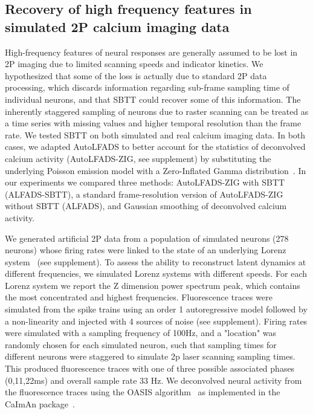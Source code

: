 \documentclass{article}
\begin{document}
\subsection{Recovery of high frequency features in simulated 2P calcium imaging data}

High-frequency features of neural responses are generally assumed to be lost in 2P imaging due to limited scanning speeds and indicator kinetics. We hypothesized that some of the loss is actually due to standard 2P data processing, which discards information regarding sub-frame sampling time of individual neurons, and that SBTT could recover some of this information. The inherently staggered sampling of neurons due to raster scanning can be treated as a time series with missing values and higher temporal resolution than the frame rate. We tested SBTT on both simulated and real calcium imaging data. In both cases, we adapted AutoLFADS to better account for the statistics of deconvolved calcium activity (AutoLFADS-ZIG, see supplement) by substituting the underlying Poisson emission model with a Zero-Inflated Gamma distribution~\cite{wei2020zero}. In our experiments we compared three methods: AutoLFADS-ZIG with SBTT (ALFADS-SBTT), a standard frame-resolution version of AutoLFADS-ZIG without SBTT (ALFADS), and Gaussian smoothing of deconvolved calcium activity. 


We generated artificial 2P data from a population of simulated neurons (278 neurons) whose firing rates were linked to the state of an underlying Lorenz system~\cite{zhao2017variational,sussillo2016lfads} (see supplement). To assess the ability to reconstruct latent dynamics at different frequencies, we simulated Lorenz systems with different speeds. For each Lorenz system we report the Z dimension power spectrum peak, which contains the most concentrated and highest frequencies. Fluorescence traces were simulated from the spike trains using an order 1 autoregressive model followed by a non-linearity and injected with 4 sources of noise (see supplement). Firing rates were simulated with a sampling frequency of 100Hz, and a "location" was randomly chosen for each simulated neuron, such that sampling times for different neurons were staggered to simulate 2p laser scanning sampling times. This produced fluorescence traces with one of three possible associated phases (0,11,22ms) and overall sample rate 33 Hz. We deconvolved neural activity from the fluorescence traces using the OASIS algorithm~\cite{friedrich2017fast} as implemented in the CaImAn package~\cite{giovannucci_caiman_2019}.
\end{document}
